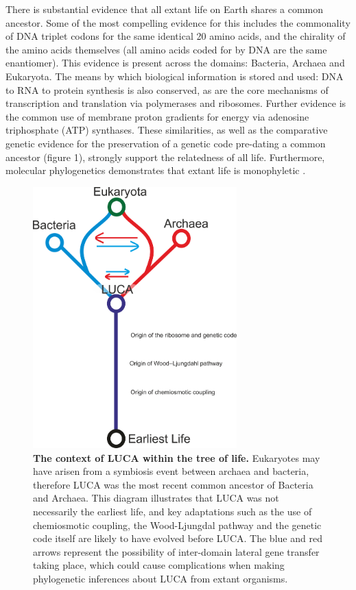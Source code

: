 There is substantial evidence that all extant life on Earth shares a common ancestor. Some of the most compelling evidence for this includes the commonality of DNA triplet codons for the same identical 20 amino acids, and the chirality of the amino acids themselves (all amino acids coded for by DNA are the same enantiomer). This evidence is present across the domains: Bacteria, Archaea and Eukaryota. The means by which biological information is stored and used: DNA to RNA to protein synthesis is also conserved, as are the core mechanisms of transcription and translation via polymerases and \gls{ribosomes}. Further evidence is the common use of membrane proton gradients for energy via adenosine triphosphate (ATP) synthases. These similarities, as well as the comparative genetic evidence for the preservation of a genetic code pre-dating a common ancestor \cite{Knight2001} (figure 1), strongly support the relatedness of all life. Furthermore, molecular phylogenetics demonstrates that extant life is monophyletic \cite{Theobald2010}.

\begin{figure}
\includegraphics[width=0.7\textwidth]{figures/LUCATREE2.png}
\centering
\caption{\textbf{The context of LUCA within the tree of life.} Eukaryotes may have arisen from a symbiosis event between archaea and bacteria, therefore LUCA was the most recent common ancestor of Bacteria and Archaea. This diagram illustrates that LUCA was not necessarily the earliest life, and key adaptations such as the use of chemiosmotic coupling, the Wood-Ljungdal pathway \cite{weiss2016} and the genetic code itself are likely to have evolved before LUCA. The blue and red arrows represent the possibility of inter-domain lateral gene transfer taking place, which could cause complications when making phylogenetic inferences about LUCA from extant organisms.}
\end{figure}

